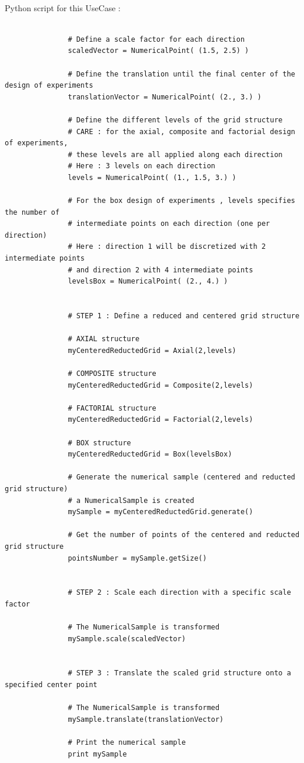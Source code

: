              \textspace\\
             Python script for this UseCase :


             \begin{lstlisting}

               # Define a scale factor for each direction
               scaledVector = NumericalPoint( (1.5, 2.5) )

               # Define the translation until the final center of the design of experiments
               translationVector = NumericalPoint( (2., 3.) )

               # Define the different levels of the grid structure
               # CARE : for the axial, composite and factorial design of experiments,
               # these levels are all applied along each direction
               # Here : 3 levels on each direction
               levels = NumericalPoint( (1., 1.5, 3.) )

               # For the box design of experiments , levels specifies the number of
               # intermediate points on each direction (one per direction)
               # Here : direction 1 will be discretized with 2 intermediate points
               # and direction 2 with 4 intermediate points
               levelsBox = NumericalPoint( (2., 4.) )


               # STEP 1 : Define a reduced and centered grid structure

               # AXIAL structure
               myCenteredReductedGrid = Axial(2,levels)

               # COMPOSITE structure
               myCenteredReductedGrid = Composite(2,levels)

               # FACTORIAL structure
               myCenteredReductedGrid = Factorial(2,levels)

               # BOX structure
               myCenteredReductedGrid = Box(levelsBox)

               # Generate the numerical sample (centered and reducted grid structure)
               # a NumericalSample is created
               mySample = myCenteredReductedGrid.generate()

               # Get the number of points of the centered and reducted grid structure
               pointsNumber = mySample.getSize()


               # STEP 2 : Scale each direction with a specific scale factor

               # The NumericalSample is transformed
               mySample.scale(scaledVector)


               # STEP 3 : Translate the scaled grid structure onto a specified center point

               # The NumericalSample is transformed
               mySample.translate(translationVector)

               # Print the numerical sample
               print mySample
             \end{lstlisting}
             \textspace\\



